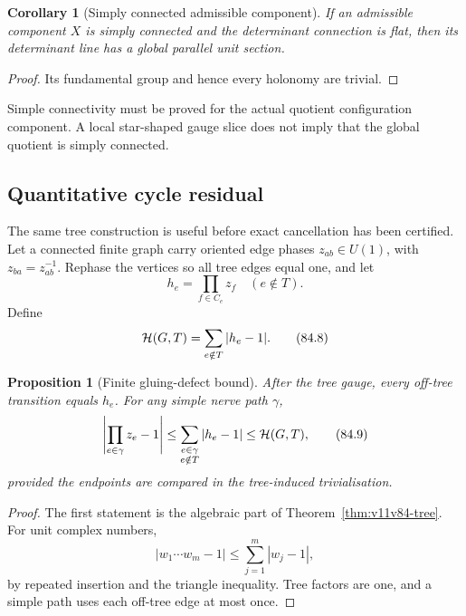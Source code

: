 \documentclass[11pt]{article}
\newtheorem{proposition}[theorem]{Proposition}
\newtheorem{corollary}[theorem]{Corollary}
\begin{document}
\begin{corollary}[Simply connected admissible component]
\label{cor:v11v84-simply}
If an admissible component \(X\) is simply connected and the
determinant connection is flat, then its determinant line has a
global parallel unit section.
\end{corollary}

\begin{proof}
Its fundamental group and hence every holonomy are trivial.
\end{proof}

Simple connectivity must be proved for the actual quotient
configuration component.  A local star-shaped gauge slice does not
imply that the global quotient is simply connected.

\subsection{Quantitative cycle residual}

The same tree construction is useful before exact cancellation has
been certified.  Let a connected finite graph carry oriented edge
phases \(z_{ab}\in U(1)\), with \(z_{ba}=z_{ab}^{-1}\).  Rephase the
vertices so all tree edges equal one, and let
\[
                              h_e=\prod_{f\in C_e}z_f
                       \quad(e\notin T).                    \tag{84.7}
\]
Define
\[
                              {\cal H}(G,T)
                       =\sum_{e\notin T}|h_e-1|.             \tag{84.8}
\]

\begin{proposition}[Finite gluing-defect bound]
\label{prop:v11v84-defect}
After the tree gauge, every off-tree transition equals \(h_e\).
For any simple nerve path \(\gamma\),
\[
 \left|\prod_{e\in\gamma}z_e-1\right|
 \le\sum_{\substack{e\in\gamma\\e\notin T}}|h_e-1|
 \le{\cal H}(G,T),                                          \tag{84.9}
\]
provided the endpoints are compared in the tree-induced
trivialisation.
\end{proposition}

\begin{proof}
The first statement is the algebraic part of
Theorem~\ref{thm:v11v84-tree}.  For unit complex numbers,
\[
 |w_1\cdots w_m-1|\le\sum_{j=1}^m|w_j-1|,
\]
by repeated insertion and the triangle inequality.  Tree factors are
one, and a simple path uses each off-tree edge at most once.
\end{proof}
\end{document}
